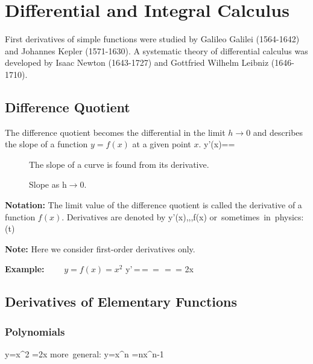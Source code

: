 

\section{Differential and Integral Calculus}\label{diff}
First derivatives of simple functions were studied by Galileo
Galilei (1564-1642) and Johannes Kepler (1571-1630). A systematic
theory of differential calculus was developed by Isaac Newton
(1643-1727) and Gottfried Wilhelm Leibniz (1646-1710).

\subsection{Difference Quotient}
The difference quotient becomes the differential in the limit
$h\rightarrow 0$ and describes the slope of a function $y=f(x)$
at a given point $x$.
\bnn y'(x)==  \enn

\begin{figure}[!h]
    \centerline{\epsfxsize=10cm \epsfysize=9cm } \svs
    \caption{The slope of a curve is found from its derivative.} \label{fig20}
\end{figure} \vs

\begin{figure}[!h]
    \centerline{\epsfxsize=10cm } \svs
    \caption{Slope as h$\rightarrow 0$.} \label{fig21}
\end{figure} \svs

{\bf Notation:} The limit value of the difference quotient is called the
derivative of a function $f(x)$. Derivatives are denoted by
\bnn y'(x)\;,\;\;,\;\;,\;f(x) \qquad
\mbox{or sometimes in physics:} \;\; (t) \enn

{\bf Note:} Here we consider first-order derivatives only.

\vs
{\bf Example:}  $\qquad y = f(x) =x^2$
\bnn
y'\,=\,= 
\,=\, 
\,=\,  = 2x
\enn \vs

\subsection{Derivatives of Elementary Functions}

\subsubsection{Polynomials}
\vspace*{-2mm}\bnn y=x^2 \quad \rightarrow \quad {}=2x
\qquad \qquad \qquad \mbox{more general:} \quad
y=x^n \quad \rightarrow \quad {}=nx^{n-1} \enn

